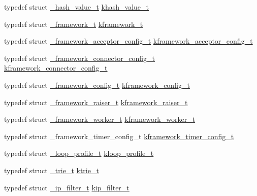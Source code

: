\begin{DoxyCompactItemize}
\item 
typedef struct \hyperlink{a00016}{\+\_\+hash\+\_\+value\+\_\+t} \hyperlink{a00054_aa13ac88a5567525fe44f3670134c3d96_aa13ac88a5567525fe44f3670134c3d96}{khash\+\_\+value\+\_\+t}
\item 
typedef struct \hyperlink{a00013}{\+\_\+framework\+\_\+t} \hyperlink{a00054_a3195a3be35782fc1efb920c811be111d_a3195a3be35782fc1efb920c811be111d}{kframework\+\_\+t}
\item 
typedef struct \hyperlink{a00009}{\+\_\+framework\+\_\+acceptor\+\_\+config\+\_\+t} \hyperlink{a00054_a39c993eb450173e4fde04498d757f9b6_a39c993eb450173e4fde04498d757f9b6}{kframework\+\_\+acceptor\+\_\+config\+\_\+t}
\item 
typedef struct \hyperlink{a00011}{\+\_\+framework\+\_\+connector\+\_\+config\+\_\+t} \hyperlink{a00054_a44d3033eba5a4fd784a741700a7a2521_a44d3033eba5a4fd784a741700a7a2521}{kframework\+\_\+connector\+\_\+config\+\_\+t}
\item 
typedef struct \hyperlink{a00010}{\+\_\+framework\+\_\+config\+\_\+t} \hyperlink{a00054_adeaf952e0f0887507ff836385bf54874_adeaf952e0f0887507ff836385bf54874}{kframework\+\_\+config\+\_\+t}
\item 
typedef struct \hyperlink{a00012}{\+\_\+framework\+\_\+raiser\+\_\+t} \hyperlink{a00054_af10637001508cbbf3a84f95c71318532_af10637001508cbbf3a84f95c71318532}{kframework\+\_\+raiser\+\_\+t}
\item 
typedef struct \hyperlink{a00014}{\+\_\+framework\+\_\+worker\+\_\+t} \hyperlink{a00054_af2a7f5b8406de73682f8bd4c2afee783_af2a7f5b8406de73682f8bd4c2afee783}{kframework\+\_\+worker\+\_\+t}
\item 
typedef struct \+\_\+framework\+\_\+timer\+\_\+config\+\_\+t \hyperlink{a00054_a6b9282027a882fd53a0d7247e69bc1c1_a6b9282027a882fd53a0d7247e69bc1c1}{kframework\+\_\+timer\+\_\+config\+\_\+t}
\item 
typedef struct \hyperlink{a00032}{\+\_\+loop\+\_\+profile\+\_\+t} \hyperlink{a00054_ab75a5c23099a6118c469ed160b277f28_ab75a5c23099a6118c469ed160b277f28}{kloop\+\_\+profile\+\_\+t}
\item 
typedef struct \hyperlink{a00039}{\+\_\+trie\+\_\+t} \hyperlink{a00054_a6b38314f31c4ed3eb36896383425a381_a6b38314f31c4ed3eb36896383425a381}{ktrie\+\_\+t}
\item 
typedef struct \hyperlink{a00017}{\+\_\+ip\+\_\+filter\+\_\+t} \hyperlink{a00054_a1c0c604eecd86fc8895cf4bbbba566af_a1c0c604eecd86fc8895cf4bbbba566af}{kip\+\_\+filter\+\_\+t}
\item 

\end{DoxyCompactItemize}
